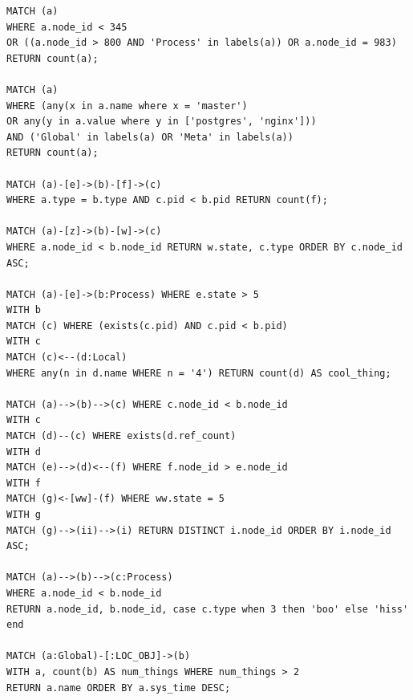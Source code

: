 \documentclass[letterpaper]{ltxdoc}
\begin{document}
\begin{verbatim}
MATCH (a)
WHERE a.node_id < 345
OR ((a.node_id > 800 AND 'Process' in labels(a)) OR a.node_id = 983)
RETURN count(a);

MATCH (a)
WHERE (any(x in a.name where x = 'master')
OR any(y in a.value where y in ['postgres', 'nginx']))
AND ('Global' in labels(a) OR 'Meta' in labels(a))
RETURN count(a);

MATCH (a)-[e]->(b)-[f]->(c)
WHERE a.type = b.type AND c.pid < b.pid RETURN count(f);

MATCH (a)-[z]->(b)-[w]->(c)
WHERE a.node_id < b.node_id RETURN w.state, c.type ORDER BY c.node_id ASC;

MATCH (a)-[e]->(b:Process) WHERE e.state > 5
WITH b
MATCH (c) WHERE (exists(c.pid) AND c.pid < b.pid)
WITH c
MATCH (c)<--(d:Local)
WHERE any(n in d.name WHERE n = '4') RETURN count(d) AS cool_thing;

MATCH (a)-->(b)-->(c) WHERE c.node_id < b.node_id
WITH c
MATCH (d)--(c) WHERE exists(d.ref_count)
WITH d
MATCH (e)-->(d)<--(f) WHERE f.node_id > e.node_id
WITH f
MATCH (g)<-[ww]-(f) WHERE ww.state = 5
WITH g
MATCH (g)-->(ii)-->(i) RETURN DISTINCT i.node_id ORDER BY i.node_id ASC;

MATCH (a)-->(b)-->(c:Process)
WHERE a.node_id < b.node_id
RETURN a.node_id, b.node_id, case c.type when 3 then 'boo' else 'hiss' end

MATCH (a:Global)-[:LOC_OBJ]->(b)
WITH a, count(b) AS num_things WHERE num_things > 2
RETURN a.name ORDER BY a.sys_time DESC;
\end{verbatim}

\end{document}
